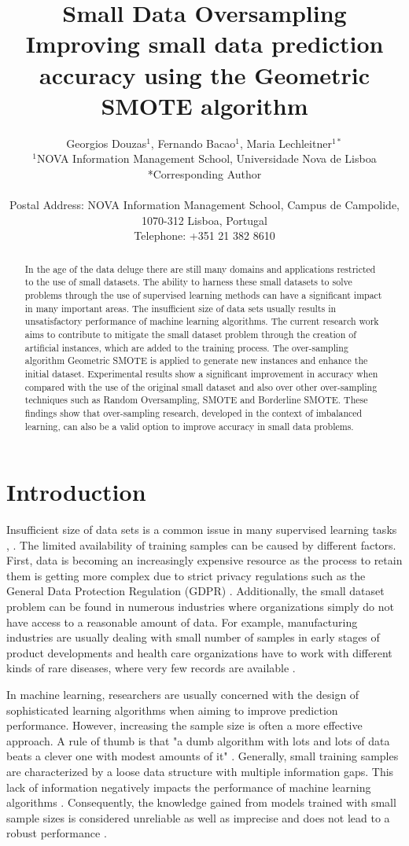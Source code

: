 \documentclass[parskip=full]{scrartcl}
\title{Small Data Oversampling  \\ \LARGE{Improving small data prediction accuracy using the Geometric SMOTE algorithm}}
\author{
	Georgios Douzas\(^{1}\), Fernando Bacao\(^{1}\), Maria Lechleitner\(^{1*}\) 
	\\
	\small{\(^{1}\)NOVA Information Management School, Universidade Nova de Lisboa}
	\\
	\small{*Corresponding Author}
	\\
	\\
	\small{Postal Address: NOVA Information Management School, Campus de Campolide, 1070-312 Lisboa, Portugal}
	\\
	\small{Telephone: +351 21 382 8610}
}
\date{}
\begin{document}
\maketitle

\begin{abstract}
In the age of the data deluge there are still many domains and applications
restricted to the use of small datasets. The ability to harness these small
datasets to solve problems through the use of supervised learning methods can
have a significant impact in many important areas. The insufficient size of data
sets usually results in unsatisfactory performance of machine learning
algorithms. The current research work aims to contribute to mitigate the small
dataset problem through the creation of artificial instances, which are added to
the training process. The over-sampling algorithm Geometric SMOTE is applied to
generate new instances and enhance the initial dataset. Experimental results
show a significant improvement in accuracy when compared with the use of the
original small dataset and also over other over-sampling techniques such as
Random Oversampling, SMOTE and Borderline SMOTE. These findings show that
over-sampling research, developed in the context of imbalanced learning, can
also be a valid option to improve accuracy in small data problems.
\end{abstract}

\section{Introduction}
Insufficient size of data sets is a common issue in many supervised learning
tasks \cite{Niyogi.1998}, \cite{AbdulLateh.2017}. The limited availability of
training samples can be caused by different factors. First, data is becoming an
increasingly expensive resource \cite{Li.2007} as the process to retain them is
getting more complex due to strict privacy regulations such as the General Data
Protection Regulation (GDPR) \cite{EuropeanCommission.2019}. Additionally, the
small dataset problem can be found in numerous industries where organizations
simply do not have access to a reasonable amount of data. For example,
manufacturing industries are usually dealing with small number of samples in
early stages of product developments and health care organizations have to work
with different kinds of rare diseases, where very few records are available
\cite{AbdulLateh.2017}.

In machine learning, researchers are usually concerned with the design of
sophisticated learning algorithms when aiming to improve prediction performance.
However, increasing the sample size is often a more effective approach. A rule
of thumb is that "a dumb algorithm with lots and lots of data beats a clever one
with modest amounts of it" \cite{Domingos.2012}. Generally, small training
samples are characterized by a loose data structure with multiple information
gaps. This lack of information negatively impacts the performance of machine
learning algorithms \cite{Lin.2018}. Consequently, the knowledge gained from
models trained with small sample sizes is considered unreliable as well as
imprecise and does not lead to a robust performance \cite{AbdulLateh.2017}.
\end{document}
